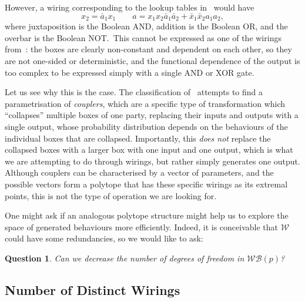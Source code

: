 \documentclass[10pt, a4paper]{article}
\numberwithin{equation}{section} %
\theoremstyle{definition}
\theoremstyle{plain}
\newtheorem{question}{Question}
\newcommand{\?}{\mathrel{?}} %
\newcommand{\sW}{\mathcal{W}}
\newcommand{\sWB}{\mathcal{WB}}
\begin{document}
      However, a wiring corresponding to the lookup tables in~ would have
      \begin{equation}
        x_2 = \bar{a}_1x_1 \qquad a = x_1x_2\bar{a}_1\bar{a}_2 + \bar{x}_1\bar{x}_2a_1a_2,
      \end{equation}
      where juxtaposition is the Boolean AND, addition is the Boolean OR, and the overbar is the Boolean NOT.\ This cannot be expressed as one of the wirings from~\cite{ShortEntangleSwap}: the boxes are clearly non-constant and dependent on each other, so they are not one-sided or deterministic, and the functional dependence of the output is too complex to be expressed simply with a single AND or XOR gate.


      Let us see why this is the case. The classification of~\cite{ShortEntangleSwap} attempts to find a parametrisation of \emph{couplers}, which are a specific type of transformation which ``collapses'' multiple boxes of one party, replacing their inputs and outputs with a single output, whose probability distribution depends on the behaviours of the individual boxes that are collapsed. Importantly, this \emph{does not} replace the collapsed boxes with a larger box with one input and one output, which is what we are attempting to do through wirings, but rather simply generates one output. Although couplers can be characterised by a vector of parameters, and the possible vectors form a polytope that has these specific wirings as its extremal points, this is not the type of operation we are looking for.

      One might ask if an analogous polytope structure might help us to explore the space of generated behaviours more efficiently. Indeed, it is conceivable that \(\sW\) could have some redundancies, so we would like to ask:
      \begin{question}\label{qn:wirspace}
        Can we decrease the number of degrees of freedom in \(\sWB(p)\)? 
      \end{question}

      \subsection{Number of Distinct Wirings}
\end{document}
